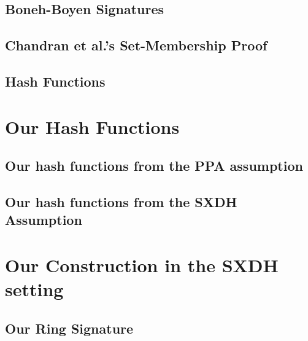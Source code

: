 \documentclass{llncs}
\begin{document}
		

	\subsection{Boneh-Boyen Signatures} \label{sec:bbs}
    
            

      	\subsection{Chandran et al.'s Set-Membership Proof} \label{sec:chan-rs}
	
       		

	\subsection{Hash Functions} \label{sec:hash}

		

    \section{Our Hash Functions} \label{sec:hf}
    
    	
    	
    	\subsection{Our hash functions from the PPA assumption} \label{sec:hf-ppa}
    	
    		

	\subsection{Our hash functions from the SXDH Assumption} \label{sec:hf-sxdh}

		

	
	
	\section{Our Construction in the SXDH setting} \label{sec:high-level}
        
        		
    	
		\subsection{Our Ring Signature}\label{sec:our-construction}
        		 
		
\end{document}
